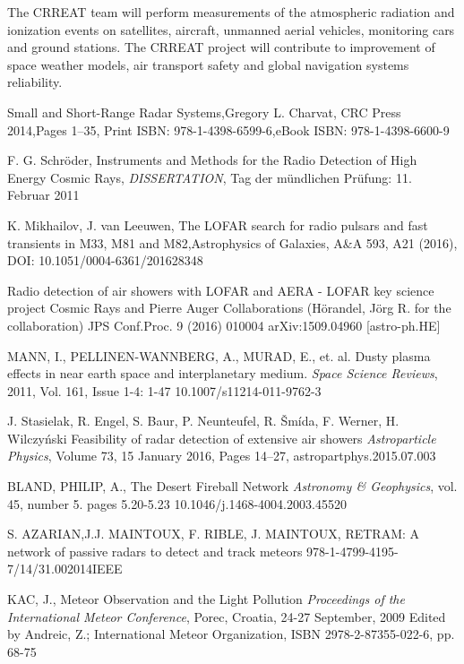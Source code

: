 \documentclass[twoside]{ctuthesis}
\theoremstyle{plain}
\theoremstyle{definition}
\theoremstyle{note}
\begin{document}
The CRREAT team will perform measurements of the atmospheric radiation and ionization events on satellites, aircraft, unmanned aerial vehicles, monitoring cars and ground stations. The CRREAT project will contribute to improvement of space weather models, air transport safety and global navigation systems reliability.

\appendix

\begin{thebibliography}{99}




Small and Short-Range Radar Systems,Gregory L. Charvat, CRC Press 2014,Pages 1–35, Print ISBN: 978-1-4398-6599-6,eBook ISBN: 978-1-4398-6600-9

F. G. Schröder, Instruments and Methods for the Radio Detection of High Energy Cosmic Rays,
\emph{DISSERTATION}, Tag der mündlichen Prüfung: 11. Februar 2011

K. Mikhailov, J. van Leeuwen, The LOFAR search for radio pulsars and fast transients in M33, M81 and M82,Astrophysics of Galaxies, A\&A 593, A21 (2016), DOI: 10.1051/0004-6361/201628348

Radio detection of air showers with LOFAR and AERA - LOFAR key science project Cosmic Rays and Pierre Auger Collaborations (Hörandel, Jörg R. for the collaboration) JPS Conf.Proc. 9 (2016) 010004 arXiv:1509.04960 [astro-ph.HE]

MANN, I., PELLINEN-WANNBERG, A., MURAD, E., et. al.
Dusty plasma effects in near earth space and interplanetary medium.
\emph{Space Science Reviews}, 2011, Vol. 161, Issue 1-4: 1-47 
10.1007/s11214-011-9762-3 

J. Stasielak, R. Engel, S. Baur, P. Neunteufel, R. Šmída, F. Werner, H. Wilczyński
Feasibility of radar detection of extensive air showers
\emph{Astroparticle Physics}, Volume 73, 15 January 2016, Pages 14–27, astropartphys.2015.07.003 


BLAND, PHILIP, A.,
The Desert Fireball Network
\emph{Astronomy \& Geophysics}, vol. 45, number 5. pages 5.20-5.23
10.1046/j.1468-4004.2003.45520

S. AZARIAN,J.J. MAINTOUX, F. RIBLE, J. MAINTOUX,
RETRAM: A network of passive radars to detect and 
track meteors
978-1-4799-4195-7/14/31.002014IEEE


KAC, J.,
Meteor Observation and the Light Pollution
\emph{Proceedings of the International Meteor Conference}, Porec, Croatia, 24-27 September, 2009 Edited by Andreic, Z.;  International Meteor Organization, ISBN 2978-2-87355-022-6, pp. 68-75


\end{thebibliography}
\end{document}
